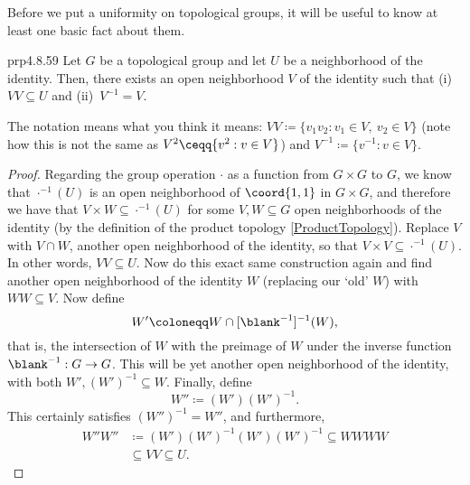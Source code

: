 Before we put a uniformity on topological groups, it will be useful to know at least one basic fact about them.
\begin{prp}{}{prp4.8.59}
Let $G$ be a topological group and let $U$ be a neighborhood of the identity.  Then, there exists an open neighborhood $V$ of the identity such that (i)~$VV\subseteq U$ and (ii)~$V^{-1}=V$.
\begin{rmk}
The notation means what you think it means:  $VV\coloneqq \{ v_1v_2:v_1\in V,\ v_2\in V\}$ (note how this is not the same as $V^2\ceqq \{ v^2:v\in V\}$) and $V^{-1}\coloneqq \{ v^{-1}:v\in V\}$.
\end{rmk}
\begin{proof}
Regarding the group operation $\cdot$ as a function from $G\times G$ to $G$, we know that $\cdot ^{-1}(U)$ is an open neighborhood of $\coord{1,1}$ in $G\times G$, and therefore we have that $V\times W\subseteq \cdot ^{-1}(U)$ for some $V,W\subseteq G$ open neighborhoods of the identity (by the definition of the product topology \cref{ProductTopology}).   Replace $V$ with $V\cap W$, another open neighborhood of the identity, so that $V\times V\subseteq \cdot ^{-1}(U)$.  In other words, $VV\subseteq U$.  Now do this exact same construction again and find another open neighborhood of the identity $W$ (replacing our `old' $W$) with $WW\subseteq V$.  Now define
\begin{equation}
W'\coloneqq W\cap [\blank ^{-1}]^{-1}(W),
\end{equation}
that is, the intersection of $W$ with the preimage of $W$ under the inverse function $\blank ^{-1}:G\rightarrow G$.  This will be yet another open neighborhood of the identity, with both $W',(W')^{-1}\subseteq W$.  Finally, define
\begin{equation}
W''\coloneqq (W')(W')^{-1}.
\end{equation}
This certainly satisfies $(W'')^{-1}=W''$, and furthermore,
\begin{equation}
\begin{split}
W''W'' & \coloneqq (W')(W')^{-1}(W')(W')^{-1}\subseteq WWWW \\
& \subseteq VV\subseteq U.
\end{split}
\end{equation}
\end{proof}
\end{prp}

